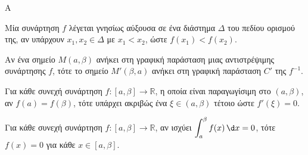 \begin{thema}{Α}
\begin{erwthma}
\begin{alist}
        \item Μία συνάρτηση $f$ λέγεται γνησίως αύξουσα σε ένα διάστημα $\Delta$ του πεδίου ορισμού της, αν υπάρχουν $x_1, x_2 \in \Delta$ με $x_1 < x_2$, ώστε $f(x_1) < f(x_2)$.
        \item Αν ένα σημείο $M(a, \beta)$ ανήκει στη γραφική παράσταση μιας αντιστρέψιμης συνάρτησης $f$, τότε το σημείο $M'(\beta, a)$ ανήκει στη γραφική παράσταση $C'$ της $f^{-1}$.
        \item Για κάθε συνεχή συνάρτηση $f : [a, \beta] \to \mathbb{R}$, η οποία είναι παραγωγίσιμη στο $(a, \beta)$, αν $f(a) = f(\beta)$, τότε υπάρχει ακριβώς ένα $\xi \in (a, \beta)$ τέτοιο ώστε $f'(\xi) = 0$.
        \item Για κάθε συνεχή συνάρτηση $f : [a, \beta] \to \mathbb{R}$, αν ισχύει $\displaystyle\int_{a}^{\beta} f(x)\,\d x = 0$, τότε $f(x) = 0$ για κάθε $x \in [a, \beta]$.
    \end{alist} 
\end{erwthma}
\end{thema}

